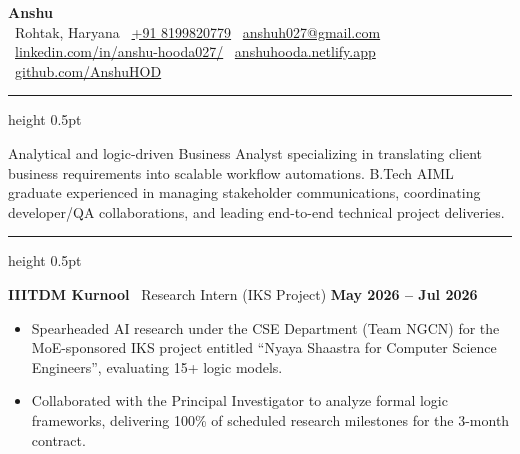 \documentclass[10pt,a4paper]{article}
\newcommand{\resumesection}[2]{
  \vspace{3pt}
  \noindent{\large\bfseries\sffamily\color{navyblue}{\mbox{#1}}\hspace{6pt}{\sffamily #2}}
  \vspace{1pt}
  \hrule height 0.5pt
  \vspace{2pt}
}
\begin{document}
\sffamily %

\begin{center}
    {\Huge\bfseries\color{navyblue} Anshu} \\
    \vspace{2pt}
    \small
    {\mbox{\color{navyblue}\faMapMarker*}}\color{textgrey}~Rohtak, Haryana \quad\textbar\quad 
    {\mbox{\color{navyblue}\faPhone*}}\color{textgrey}~\href{tel:+918199820779}{+91 8199820779} \quad\textbar\quad 
    {\mbox{\color{navyblue}\faEnvelope}}\color{textgrey}~\href{mailto:anshuh027@gmail.com}{anshuh027@gmail.com} \\
    \vspace{1pt}
    {\mbox{\color{navyblue}\faLinkedin}}\color{hyperblue}~\href{https://www.linkedin.com/in/anshu-hooda027/}{linkedin.com/in/anshu-hooda027/} \quad\textbar\quad 
    {\mbox{\color{navyblue}\faGlobe}}\color{hyperblue}~\href{https://anshuhooda.netlify.app}{anshuhooda.netlify.app} \quad\textbar\quad 
    {\mbox{\color{navyblue}\faGithub}}\color{hyperblue}~\href{https://github.com/AnshuHOD}{github.com/AnshuHOD}
\end{center}

\vspace{-6pt}

\resumesection{\faUser}{Professional Summary}
Analytical and logic-driven Business Analyst specializing in translating client business requirements into scalable workflow automations. B.Tech AIML graduate experienced in managing stakeholder communications, coordinating developer/QA collaborations, and leading end-to-end technical project deliveries.

\resumesection{\faBriefcase}{Work Experience}

\noindent
\textbf{IIITDM Kurnool} \textbar\ Research Intern (IKS Project) \hfill \textbf{May 2026 -- Jul 2026}
\begin{itemize}[leftmargin=*, noitemsep, topsep=1pt, parsep=0.5pt, partopsep=0pt, itemsep=0.5pt]
    \item Spearheaded AI research under the CSE Department (Team NGCN) for the MoE-sponsored IKS project entitled ``Nyaya Shaastra for Computer Science Engineers'', evaluating 15+ logic models.
    \item Collaborated with the Principal Investigator to analyze formal logic frameworks, delivering 100\% of scheduled research milestones for the 3-month contract.
\end{itemize}
\end{document}
